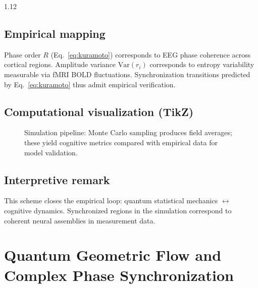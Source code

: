 \documentclass[12pt,a4paper]{article}
\numberwithin{equation}{section}
\theoremstyle{remark}
\theoremstyle{definition}
\begin{document}
\begin{spacing}{1.12}
\subsection{Empirical mapping}
\label{subsec:empirical}
Phase order $R$ (Eq.~\eqref{eq:kuramoto}) corresponds to EEG phase coherence across cortical regions.
Amplitude variance $\mathrm{Var}(r_i)$ corresponds to entropy variability measurable via fMRI BOLD fluctuations.
Synchronization transitions predicted by Eq.~\eqref{eq:kuramoto}
thus admit empirical verification.

\subsection{Computational visualization (TikZ)}
\label{subsec:visualization}

\begin{figure}[H]
\centering
{}
\caption{Simulation pipeline: Monte Carlo sampling produces field averages; these yield cognitive metrics compared with empirical data for model validation.}
\label{fig:pipeline}
\end{figure}

\subsection{Interpretive remark}
This scheme closes the empirical loop:
quantum statistical mechanics $\leftrightarrow$ cognitive dynamics.
Synchronized regions in the simulation correspond to coherent neural assemblies in measurement data.


\section{Quantum Geometric Flow and Complex Phase Synchronization}
\label{sec:quantum-geometric-flow}


\end{spacing}
\end{document}
